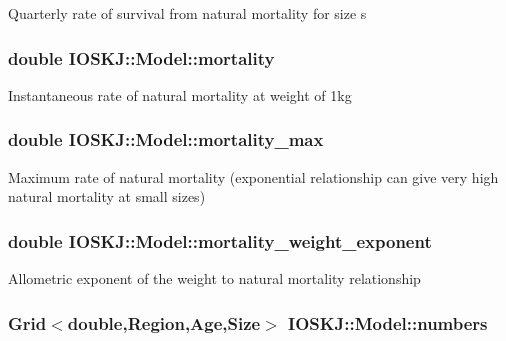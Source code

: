 Quarterly rate of survival from natural mortality for size s \hypertarget{classIOSKJ_1_1Model_a970fad74268a92b08807a7cdbb32468b}{
\subsubsection[{mortality}]{\setlength{\rightskip}{0pt plus 5cm}double I\-O\-S\-K\-J\-::\-Model\-::mortality}}\label{classIOSKJ_1_1Model_a970fad74268a92b08807a7cdbb32468b}
Instantaneous rate of natural mortality at weight of 1kg \hypertarget{classIOSKJ_1_1Model_a7c6726c255509c23749664a82ed4c4a9}{
\subsubsection[{mortality\-\_\-max}]{\setlength{\rightskip}{0pt plus 5cm}double I\-O\-S\-K\-J\-::\-Model\-::mortality\-\_\-max}}\label{classIOSKJ_1_1Model_a7c6726c255509c23749664a82ed4c4a9}
Maximum rate of natural mortality (exponential relationship can give very high natural mortality at small sizes) \hypertarget{classIOSKJ_1_1Model_a6a3e26a7c2e42634669ea2526626a18e}{
\subsubsection[{mortality\-\_\-weight\-\_\-exponent}]{\setlength{\rightskip}{0pt plus 5cm}double I\-O\-S\-K\-J\-::\-Model\-::mortality\-\_\-weight\-\_\-exponent}}\label{classIOSKJ_1_1Model_a6a3e26a7c2e42634669ea2526626a18e}
Allometric exponent of the weight to natural mortality relationship \hypertarget{classIOSKJ_1_1Model_a6dd60d98959cc31142f0b4118d52d8b3}{
\subsubsection[{numbers}]{\setlength{\rightskip}{0pt plus 5cm}Grid$<$double,Region,Age,Size$>$ I\-O\-S\-K\-J\-::\-Model\-::numbers}}\label{classIOSKJ_1_1Model_a6dd60d98959cc31142f0b4118d52d8b3}
